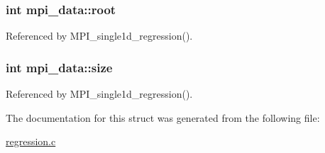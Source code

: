 \subsubsection[{\texorpdfstring{root}{root}}]{\setlength{\rightskip}{0pt plus 5cm}int mpi\+\_\+data\+::root}\hypertarget{structmpi__data_a9154a09cb4cd23dcbd2eb96adf434756}{}\label{structmpi__data_a9154a09cb4cd23dcbd2eb96adf434756}


Referenced by M\+P\+I\+\_\+single1d\+\_\+regression().

\subsubsection[{\texorpdfstring{size}{size}}]{\setlength{\rightskip}{0pt plus 5cm}int mpi\+\_\+data\+::size}\hypertarget{structmpi__data_a454bff7b727bb81687b01da221a284ab}{}\label{structmpi__data_a454bff7b727bb81687b01da221a284ab}


Referenced by M\+P\+I\+\_\+single1d\+\_\+regression().



The documentation for this struct was generated from the following file\+:\begin{DoxyCompactItemize}
\item 
\hyperlink{regression_8c}{regression.\+c}\end{DoxyCompactItemize}

